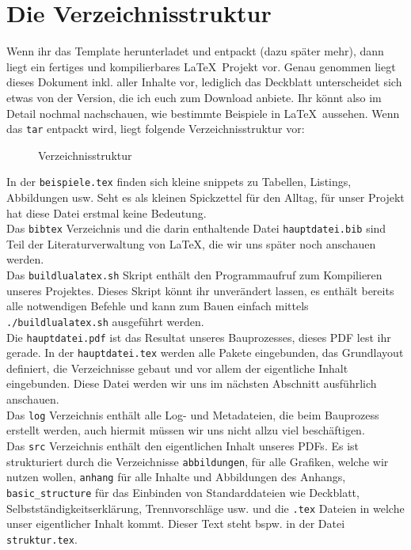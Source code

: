 \section{Die Verzeichnisstruktur}\label{struktur}

Wenn ihr das Template herunterladet und entpackt (dazu später mehr), dann liegt
ein fertiges und kompilierbares \LaTeX~Projekt vor. Genau genommen liegt dieses
Dokument inkl. aller Inhalte vor, lediglich das Deckblatt unterscheidet sich
etwas von der Version, die ich euch zum Download anbiete. Ihr könnt also im
Detail nochmal nachschauen, wie bestimmte Beispiele in \LaTeX~aussehen. Wenn
das \texttt{tar} entpackt wird, liegt folgende Verzeichnisstruktur vor:

\FloatBarrier
\begin{figure}[!ht]
	\caption[Verzeichnisstruktur]{Verzeichnisstruktur}
	\label{dirtree}
\end{figure}
\FloatBarrier

In der \texttt{beispiele.tex} finden sich kleine snippets zu Tabellen, Listings,
Abbildungen usw. Seht es als kleinen Spickzettel für den Alltag, für unser
Projekt hat diese Datei erstmal keine Bedeutung.\\ Das \texttt{bibtex}
Verzeichnis und die darin enthaltende Datei \texttt{hauptdatei.bib} sind Teil der
Literaturverwaltung von \LaTeX, die wir uns später noch anschauen werden.\\ Das
\texttt{buildlualatex.sh} Skript enthält den Programmaufruf zum Kompilieren
unseres Projektes. Dieses Skript könnt ihr unverändert lassen, es enthält
bereits alle notwendigen Befehle und kann zum Bauen einfach mittels
\texttt{./buildlualatex.sh} ausgeführt werden.\\ Die \texttt{hauptdatei.pdf} ist
das Resultat unseres Bauprozesses, dieses PDF lest ihr gerade. In der
\texttt{haupt\-da\-tei\-.tex} werden alle Pakete eingebunden, das Grundlayout
definiert, die Verzeichnisse gebaut und vor allem der eigentliche Inhalt
eingebunden. Diese Datei werden wir uns im nächsten Abschnitt ausführlich
anschauen.\\ Das \texttt{log} Verzeichnis enthält alle Log- und Metadateien, die
beim Bauprozess erstellt werden, auch hiermit müssen wir uns nicht allzu viel
beschäftigen.\\ Das \texttt{src} Verzeichnis enthält den eigentlichen Inhalt
unseres PDFs. Es ist strukturiert durch die Verzeichnisse \texttt{abbildungen},
für alle Grafiken, welche wir nutzen wollen, \texttt{anhang} für alle Inhalte
und Abbildungen des Anhangs, \texttt{basic\_structure} für das Einbinden von
Standarddateien wie Deckblatt, Selbstständigkeitserklärung, Trennvorschläge usw.
und die \texttt{.tex} Dateien in welche unser eigentlicher Inhalt kommt. Dieser
Text steht bspw. in der Datei \texttt{struktur.tex}.

